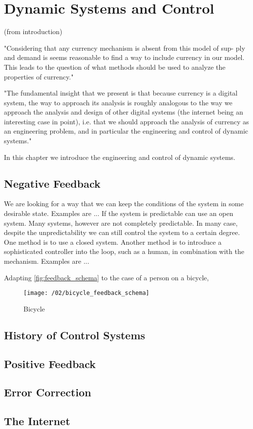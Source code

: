\chapter{Dynamic Systems and Control}

% 

(from introduction)

"Considering that any currency mechanism is absent from this model of sup-
ply and demand is seems reasonable to find a way to include currency in our
model. This leads to the question of what methods should be used to analyze
the properties of currency."

"The fundamental insight that we present is that because currency is a digital
system, the way to approach its analysis is roughly analogous to the way we
approach the analysis and design of other digital systems (the internet being an
interesting case in point), i.e. that we should approach the analysis of currency
as an engineering problem, and in particular the engineering and control of
dynamic systems."

In this chapter we introduce the engineering and control of dynamic systems.

\section{Negative Feedback}

We are looking for a way that we can keep the conditions of the system in some desirable state.
Examples are ... If the system is predictable can use an open system. Many systems, however are not
completely predictable. In many case, despite the unpredictability we can still control the system
to a certain degree. One method is to use a closed system. Another method is to introduce a
sophisticated controller into the loop, such as a human, in combination with the mechanism. Examples
are ...

Adapting \ref{fig:feedback_schema} to the case of a person on a bicycle,

\begin{figure}
\texttt{[image: /02/bicycle\_feedback\_schema]}
\caption{Bicycle}
\label{fig:bicycle_feedback_schema}
\end{figure}

\section{History of Control Systems} 

\section{Positive Feedback}

\section{Error Correction}

\section{The Internet}


